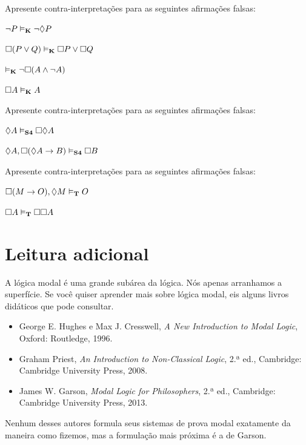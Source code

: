 \practiceproblems

\problempart
Apresente contra-interpretações para as seguintes afirmações falsas:
\begin{compactlist}
	\item $\neg P \vDash_{\mathbf{K}} \neg\Diamond P$
	\item $\Box(P \vee Q)\vDash_{\mathbf{K}} \Box P \vee \Box Q$
	\item $\vDash_{\mathbf{K}} \neg \Box (A\wedge \neg A)$
	\item $\Box A\vDash_{\mathbf{K}} A$
\end{compactlist}

\problempart
Apresente contra-interpretações para as seguintes afirmações falsas:
\begin{compactlist}
	\item $\Diamond A\vDash_{\mathbf{S4}} \Box\Diamond A$
	\item $\Diamond A, \Box (\Diamond A \rightarrow B)\vDash_{\mathbf{S4}}\Box B$
\end{compactlist}

\problempart
Apresente contra-interpretações para as seguintes afirmações falsas:
\begin{compactlist}
	\item $\Box (M\rightarrow O),\Diamond M\vDash_{\mathbf{T}} O$
	\item $\Box A\vDash_{\mathbf{T}} \Box \Box A$
\end{compactlist}

\section*{Leitura adicional}

A lógica modal é uma grande subárea da lógica. Nós apenas arranhamos a superfície. Se você quiser aprender mais sobre lógica modal, eis alguns livros didáticos que pode consultar.

\begin{itemize}
	\item George E. Hughes e Max J. Cresswell, \textit{A New Introduction
	to Modal Logic}, Oxford: Routledge, 1996.
	\item Graham Priest, \textit{An Introduction to Non-Classical Logic},
	2.ª ed., Cambridge: Cambridge University Press, 2008.
	\item James W. Garson, \textit{Modal Logic for Philosophers}, 2.ª
	ed., Cambridge: Cambridge University Press, 2013.
\end{itemize}

Nenhum desses autores formula seus sistemas de prova modal exatamente da maneira como fizemos, mas a formulação mais próxima é a de Garson.
